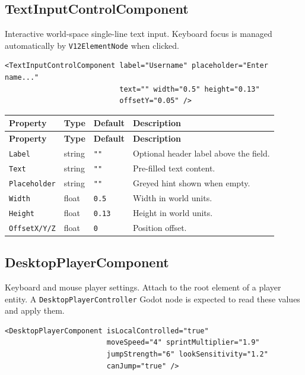 \documentclass[11pt,a4paper]{article}
\begin{document}
\subsection{TextInputControlComponent}

Interactive world-space single-line text input. Keyboard focus is managed
automatically by \texttt{V12ElementNode} when clicked.

\begin{lstlisting}
<TextInputControlComponent label="Username" placeholder="Enter name..."
                           text="" width="0.5" height="0.13"
                           offsetY="0.05" />
\end{lstlisting}

\begin{longtable}{P{3.2cm} P{2cm} P{2.5cm} P{5.3cm}}
  \toprule
  \textbf{Property} & \textbf{Type} & \textbf{Default} & \textbf{Description} \\
  \midrule
  \endfirsthead
  \toprule
  \textbf{Property} & \textbf{Type} & \textbf{Default} & \textbf{Description} \\
  \midrule
  \endhead
  \texttt{Label} & string & \texttt{""} & Optional header label above the field. \\
  \texttt{Text} & string & \texttt{""} & Pre-filled text content. \\
  \texttt{Placeholder} & string & \texttt{""} & Greyed hint shown when empty. \\
  \texttt{Width} & float & \texttt{0.5} & Width in world units. \\
  \texttt{Height} & float & \texttt{0.13} & Height in world units. \\
  \texttt{OffsetX/Y/Z} & float & \texttt{0} & Position offset. \\
  \bottomrule
\end{longtable}

\subsection{DesktopPlayerComponent}

Keyboard and mouse player settings. Attach to the root element of a player
entity. A \texttt{DesktopPlayerController} Godot node is expected to read
these values and apply them.

\begin{lstlisting}
<DesktopPlayerComponent isLocalControlled="true"
                        moveSpeed="4" sprintMultiplier="1.9"
                        jumpStrength="6" lookSensitivity="1.2"
                        canJump="true" />
\end{lstlisting}
\end{document}

